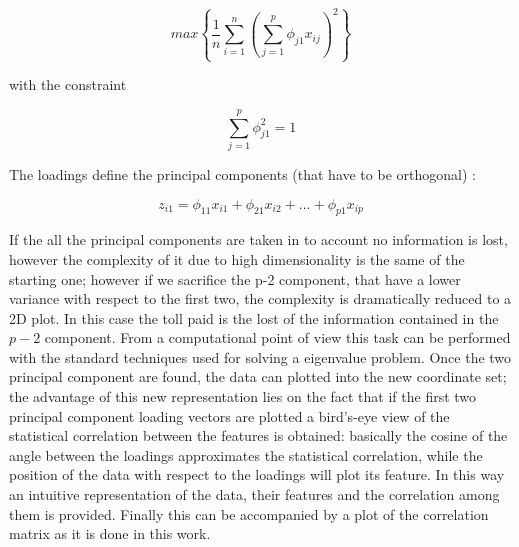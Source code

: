 \documentclass[
12pt, %
a4paper, %
oneside, %
headinclude,footinclude, %
BCOR5mm, %
]{scrartcl}
\begin{document}
\begin{equation}
max\left\lbrace \dfrac{1}{n} \sum_{i=1}^{n} \left(\sum^{p} _{j=1} \phi_{j1}x_{ij} \right)^{2}   \right\rbrace
\end{equation}

with the constraint 

\begin{equation}
\sum_{j=1}^{p}\phi_{j1}^{2}=1
\end{equation}

The loadings define the principal components (that have to be orthogonal) : 

\begin{equation}
z_{i1}=\phi_{11}x_{i1}+\phi_{21}x_{i2}+...+\phi_{p1}x_{ip}
\end{equation}

If the all the principal components are taken in to account no information is lost, however the complexity of it due to high dimensionality is the same of the starting one; however if we sacrifice the p-2 component, that have a lower variance with respect to the first two, the complexity is dramatically reduced to a 2D plot. In this case the toll paid is the lost of the information contained in the $p-2$ component. From a computational point of view this task can be performed with the standard techniques used for solving a eigenvalue problem. Once the two principal component are found, the data can plotted into the new coordinate set; the advantage of this new representation lies on the fact that if the first two principal component loading vectors are plotted a bird's-eye view of the statistical correlation between the features is obtained: basically the cosine of the angle between the loadings approximates the statistical correlation, while the position of the data with respect to the loadings will plot its feature. In this way an intuitive representation of the data, their features and the correlation among them is provided. Finally this can be accompanied by a plot of the correlation matrix as it is done in this work. 













\renewcommand{\refname}{\spacedlowsmallcaps{References}} %




\end{document}
